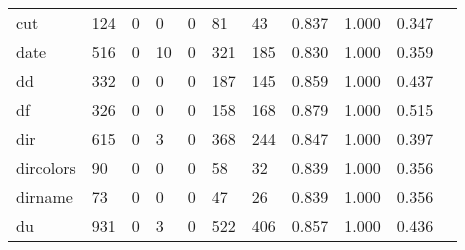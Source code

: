\begin{longtable}{lp{1.10cm}p{1.10cm}p{1.10cm}p{1.10cm}p{1.10cm}p{1.10cm}p{1.10cm}p{1.10cm}p{1.10cm}p{1.10cm}}
cut       &                    124 &                                  0 &                                 0 &                                0 &                                81 &                              43 &                          0.837 &                                 1.000 &                               0.347 \\
date      &                    516 &                                  0 &                                10 &                                0 &                               321 &                             185 &                          0.830 &                                 1.000 &                               0.359 \\
dd        &                    332 &                                  0 &                                 0 &                                0 &                               187 &                             145 &                          0.859 &                                 1.000 &                               0.437 \\
df        &                    326 &                                  0 &                                 0 &                                0 &                               158 &                             168 &                          0.879 &                                 1.000 &                               0.515 \\
dir       &                    615 &                                  0 &                                 3 &                                0 &                               368 &                             244 &                          0.847 &                                 1.000 &                               0.397 \\
dircolors &                     90 &                                  0 &                                 0 &                                0 &                                58 &                              32 &                          0.839 &                                 1.000 &                               0.356 \\
dirname   &                     73 &                                  0 &                                 0 &                                0 &                                47 &                              26 &                          0.839 &                                 1.000 &                               0.356 \\
du        &                    931 &                                  0 &                                 3 &                                0 &                               522 &                             406 &                          0.857 &                                 1.000 &                               0.436 \\

\end{longtable}
